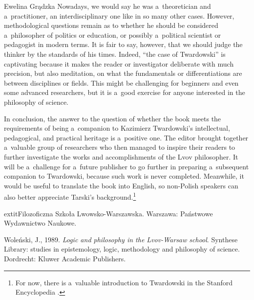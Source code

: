 \begin{newrevengenv}{Ewelina Grądzka}
Nowadays, we would say he was a~theoretician and a~practitioner, an interdisciplinary one like in so many other cases. However, methodological questions remain as to whether he should be considered a~philosopher of politics or education, or possibly a~political scientist or pedagogist in modern terms. It is fair to say, however, that we should judge the thinker by the standards of his times. Indeed, ``the case of Twardowski'' is captivating because it makes the reader or investigator deliberate with much precision, but also meditation, on what the fundamentals or differentiations are between disciplines or fields. This might be challenging for beginners and even some advanced researchers, but it is a~good exercise for anyone interested in the philosophy of science.

In conclusion, the answer to the question of whether the book meets the requirements of being a~companion to Kazimierz Twardowski's intellectual, pedagogical, and practical heritage is a~positive one. The editor brought together a~valuable group of researchers who then managed to inspire their readers to further investigate the works and accomplishments of the Lvov philosopher. It will be a~challenge for a~future publisher to go further in preparing a~subsequent companion to Twardowski, because such work is never completed. Meanwhile, it would be useful to translate the book into English, so non-Polish speakers can also better appreciate Tarski's background.\footnote{For now, there is a~valuable introduction to Twardowski in the Stanford Encyclopedia
\parencite{betti_kazimierz_2019}.
}

extit{Filozoficzna Szkoła Lwowsko-Warszawska}. Warszawa: Państwowe Wydawnictwo Naukowe.

Woleński, J., 1989. \textit{Logic and philosophy in the Lvov-Warsaw school}. Synthese Library: studies in epistemology, logic, methodology and philosophy of science. Dordrecht: Kluwer Academic Publishers.






\end{newrevengenv}
